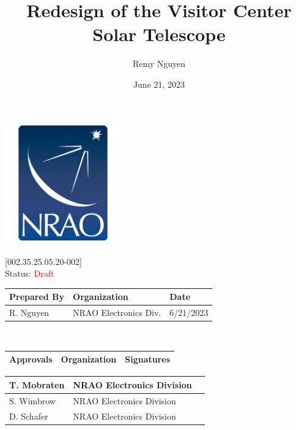 \documentclass[titlepage]{article}
\title{Redesign of the Visitor Center Solar Telescope}
\author{Remy Nguyen
    }%
\date{June 21, 2023}
\def\docnum{[002.35.25.05.20-002]}
\def\status{\textcolor{red}{Draft}}
\begin{document}
\setlength{\leftmargin}{1in}
\setlength{\rightmargin}{1in}

\begin{titlepage}
\begin{center}
     \includegraphics[width=5cm]{images/NRAO Logo Badge.png} \\
     \vspace*{0.5cm}
     \textbf{\Huge\thetitle} \\
     \vspace*{0.5cm}
     \large\docnum \\
     \huge Status: \status \\
     \vspace*{1cm} \large
     \begin{tabular}{|m{6.93cm}|m{4.5cm}|m{2cm}|} \hline
        \rowcolor{nraoblue}
        \textbf{Prepared By} & \textbf{Organization} & \textbf{Date} \\ \hline
        R. Nguyen & NRAO Electronics Div. & 6/21/2023 \\ 
        \hline
    \end{tabular} \\
    \vspace*{1cm}
    \begin{tabular}{|m{3cm}|m{3.5cm}|m{6.93cm}|} \hline
        \rowcolor{nraoblue}
        \textbf{Approvals} & \textbf{Organization} & \textbf{Signatures} \\ \hline
    \end{tabular}
    \renewcommand{\arraystretch}{1.5}
    \begin{tabular}{|m{3cm}|m{3.5cm}|m{6.93cm}|}
        T. Mobraten & NRAO Electronics Division &  \\ 
        \hline
        S. Wimbrow & NRAO Electronics Division &  \\ 
        \hline
        D. Schafer & NRAO Electronics Division &  \\ 

\end{tabular}
\end{center}
\end{titlepage}
\end{document}
